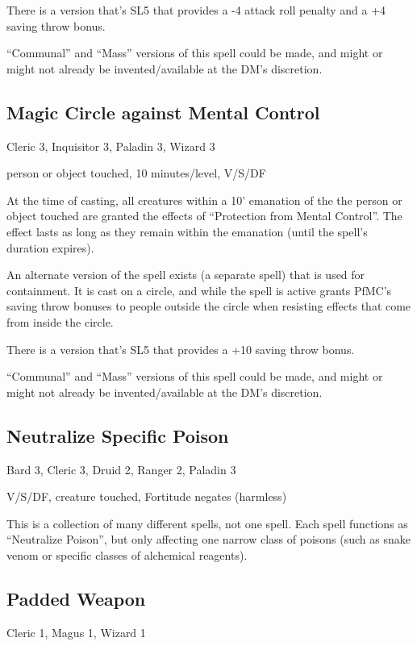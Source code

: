 There is a version that's SL5 that provides a -4 attack roll penalty and
a +4 saving throw bonus.

``Communal'' and ``Mass'' versions of this spell could be made, and might
or might not already be invented/available at the DM's discretion.
%

%
\subsection{Magic Circle against Mental Control}

Cleric 3, Inquisitor 3, Paladin 3, Wizard 3

person or object touched, 10 minutes/level, V/S/DF

At the time of casting, all creatures within a 10' emanation of the the
person or object touched are granted the effects of ``Protection from Mental
Control''. The effect lasts as long as they remain within the emanation
(until the spell's duration expires).

An alternate version of the spell exists (a separate spell) that is used
for containment. It is cast on a circle, and while the spell is active
grants PfMC's saving throw bonuses to people outside the circle when
resisting effects that come from inside the circle.

There is a version that's SL5 that provides a +10 saving throw bonus.

``Communal'' and ``Mass'' versions of this spell could be made, and might
or might not already be invented/available at the DM's discretion.
%

%
\subsection{Neutralize Specific Poison}

Bard 3, Cleric 3, Druid 2, Ranger 2, Paladin 3

V/S/DF, creature touched, Fortitude negates (harmless)

This is a collection of many different spells, not one spell. Each spell
functions as ``Neutralize Poison'', but only affecting one narrow class of
poisons (such as snake venom or specific classes of alchemical reagents).
%

%
\subsection{Padded Weapon}

Cleric 1, Magus 1, Wizard 1

